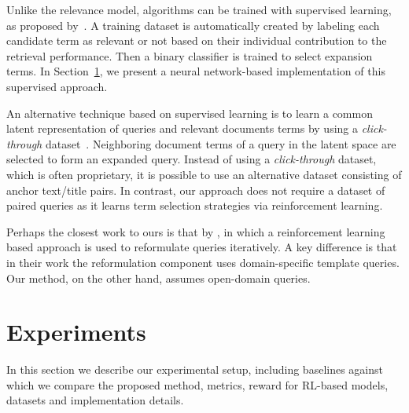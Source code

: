 \documentclass[11pt,letterpaper]{article}
\begin{document}

Unlike the relevance model, algorithms can be trained with supervised learning, as proposed by~\citet{cao2008selecting}. A training dataset is automatically created by labeling each candidate term as relevant or not based on their individual contribution to the retrieval performance. Then a binary classifier is trained to select expansion terms. In Section~\ref{sec:experiments}, we present a neural network-based implementation of this supervised approach.

An alternative technique based on supervised learning is to learn a common latent representation of queries and relevant documents terms by using a \textit{click-through} dataset~\cite{sordoni2014learning}. Neighboring document terms of a query in the latent space are selected to form an expanded query. Instead of using a \textit{click-through} dataset, which is often proprietary, it is possible to use an alternative dataset consisting of anchor text/title pairs. In contrast, our approach does not require a dataset of paired queries as it learns term selection strategies via reinforcement learning.

Perhaps the closest work to ours is that by \citet{narasimhan2016improving}, in which a reinforcement learning based approach is used to reformulate queries iteratively.
A key difference is that in their work the reformulation component uses domain-specific template queries. Our method, on the other hand, assumes open-domain queries. 


\section{Experiments}
\label{sec:experiments}
In this section we describe our experimental setup, including baselines against which we compare the proposed method, metrics, reward for RL-based models, datasets and implementation details.
\end{document}
